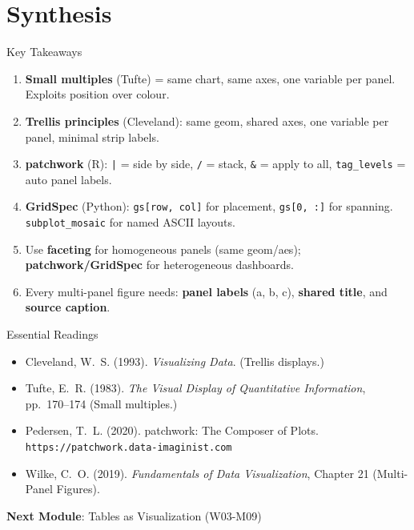 \documentclass[10pt]{beamer}
\begin{document}
\section{Synthesis}

\begin{frame}{Key Takeaways}
  \begin{enumerate}
    \item \textbf{Small multiples} (Tufte) = same chart, same axes,
          one variable per panel. Exploits position over colour.
    \item \textbf{Trellis principles} (Cleveland): same geom, shared axes,
          one variable per panel, minimal strip labels.
    \item \textbf{patchwork} (R): \texttt{|} = side by side, \texttt{/} =
          stack, \texttt{\&} = apply to all, \texttt{tag\_levels} = auto
          panel labels.
    \item \textbf{GridSpec} (Python): \texttt{gs[row, col]} for placement,
          \texttt{gs[0, :]} for spanning. \texttt{subplot\_mosaic} for
          named ASCII layouts.
    \item Use \textbf{faceting} for homogeneous panels (same geom/aes);
          \textbf{patchwork/GridSpec} for heterogeneous dashboards.
    \item Every multi-panel figure needs: \textbf{panel labels} (a, b, c),
          \textbf{shared title}, and \textbf{source caption}.
  \end{enumerate}
\end{frame}

\begin{frame}{Essential Readings}
  \begin{itemize}
    \item Cleveland, W.~S. (1993). \emph{Visualizing Data}. (Trellis displays.)
    \item Tufte, E.~R. (1983). \emph{The Visual Display of Quantitative
          Information}, pp.\ 170--174 (Small multiples.)
    \item Pedersen, T.~L. (2020). patchwork: The Composer of Plots.
          \texttt{https://patchwork.data-imaginist.com}
    \item Wilke, C.~O. (2019). \emph{Fundamentals of Data Visualization},
          Chapter 21 (Multi-Panel Figures).
  \end{itemize}
  \vspace{6pt}
  \textbf{Next Module}: Tables as Visualization (W03-M09)
\end{frame}
\end{document}

